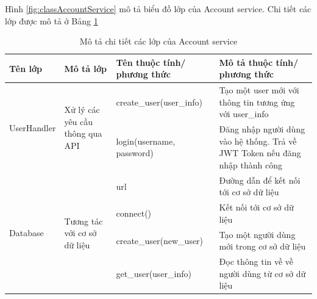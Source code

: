 \documentclass[../DoAn.tex]{subfiles}
\begin{document}
Hình \ref{fig:classAccountService} mô tả biểu đồ lớp của Account service. Chi
tiết các lớp được mô tả ở Bảng \ref{tab:classAccountService}

\begin{longtable}{|p{}|p{}|p{}|p{}|}
    \caption{Mô tả chi tiết các lớp của Account service}
    \label{tab:classAccountService}                                                                                                                                                                                                \\
    \hline
    Tên lớp                                       & Mô tả lớp                                                         & Tên thuộc tính/ phương thức & Mô tả thuộc tính/ phương thức                                                \\ \hline
    \multirow[t]{2}{0.175\textwidth}{UserHandler} & \multirow[t]{2}{0.175\textwidth}{Xử lý các yêu cầu thông qua API} & create\_user(user\_info)    & Tạo một user mới với thông tin tương ứng với user\_info                      \\ \hline
                                                  &                                                                   & login(username, password)   & Đăng nhập người dùng vào hệ thống. Trả về JWT Token nếu đăng nhập thành công \\ \hline
    \multirow[t]{4}{0.175\textwidth}{Database}    & \multirow[t]{4}{0.175\textwidth}{Tương tác với cơ sở dữ liệu}     & url                         & Đường dẫn để kết nối tới cơ sở dữ liệu                                       \\ \cline{3-4}
                                                  &                                                                   & connect()                   & Kết nối tới cơ sở dữ liệu                                                    \\ \cline{3-4}
                                                  &                                                                   & create\_user(new\_user)     & Tạo một người dùng mới trong cơ sở dữ liệu                                   \\ \cline{3-4}
                                                  &                                                                   & get\_user(user\_info)       & Đọc thông tin về về người dùng từ cơ sở dữ liệu                              \\ \hline
\end{longtable}
\end{document}
